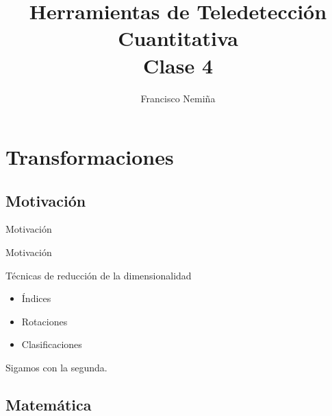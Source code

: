 \documentclass[]{beamer}
\title{Herramientas de Teledetección Cuantitativa\\{\small Clase 4}}
\author{Francisco Nemi\~na}
\institute{Unidad de Educación y Formación Masiva \\ Comisión Nacional de
Actividades Espaciales}
\date{}
\begin{document}
\begin{frame}
    \maketitle
\end{frame}

\section{Transformaciones}
\subsection{Motivación}

\begin{frame}{Motivación}
  \begin{center}
    \end{center}
\end{frame}

\begin{frame}{Motivación}
  \begin{block}{Técnicas de reducción de la dimensionalidad}
    \begin{itemize}[<+->]
      \item Índices
      \item Rotaciones
      \item Clasificaciones
    \end{itemize}
    Sigamos con la segunda.
  \end{block}
\end{frame}

\subsection{Matemática}
\end{document}
